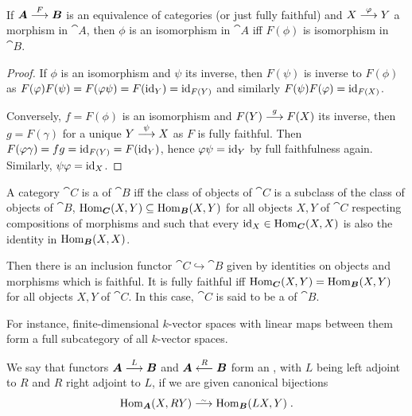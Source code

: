 \documentclass[a4paper,parskip=half,numbers=enddot, DIV=12]{scrreprt}
\begin{document}
	\begin{fact}
		If ${\cat A}\morphism[F] {\cat B}$ is an equivalence of categories (or just fully faithful) and $X\morphism[\phi]Y$ a morphism in ${\cat A}$, then $\phi$ is an isomorphism in ${\cat A}$ iff $F(\phi)$ is isomorphism in ${\cat B}$. 
	\end{fact}
	\begin{proof}
		If $\phi$ is an isomorphism and $\psi$ its inverse, then $F(\psi)$ is inverse to $F(\phi)$ as $F(\varphi)F(\psi)=F(\varphi\psi)=F(\operatorname{id}_Y)=\operatorname{id}_{F(Y)}$ and similarly $F(\psi)F(\varphi)=\operatorname{id}_{F(X)}$.
		
		Conversely, $f=F(\phi)$ is an isomorphism and $F(Y) \morphism[g] F(X)$ its inverse, then $g= F(\gamma)$ for a unique $Y\morphism[\psi] X$ as $F$ is fully faithful. Then $F(\varphi\gamma)=fg=\operatorname{id}_{F(Y)}=F(\operatorname{id}_Y)$, hence $\varphi\psi=\operatorname{id}_Y$ by full faithfulness again. Similarly, $\psi\varphi=\operatorname{id}_X$.
	\end{proof}
	\begin{defi}
		A category ${\cat C}$ is a  of ${\cat B}$ iff the class of objects of ${\cat C}$ is a subclass of the class of objects of ${\cat B}$, $\Hom_{\cat C}(X,Y) \subseteq \Hom_{\cat B}(X,Y)$ for all objects $X,Y$ of ${\cat C}$ respecting compositions of morphisms and such that every $\id_X\in\Hom_{\cat C}(X,X)$ is also the identity in $\Hom_{\cat B}(X,X)$. 
		
		Then there is an inclusion functor ${\cat C}\hookrightarrow{\cat B}$ given by identities on objects and morphisms which is faithful. It is fully faithful iff $\Hom_{\cat C}(X,Y)=\Hom_{\cat B}(X,Y)$ for all objects $X,Y$ of ${\cat C}$. In this case, ${\cat C}$ is said to be a  of ${\cat B}$. 
	\end{defi}
	\begin{example}
		For instance, finite-dimensional $k$-vector spaces with linear maps between them form a full subcategory of all $k$-vector spaces.
	\end{example}
	 \begin{defi}
	 	We say that functors ${\cat A}\morphism[L] {\cat B}$ and ${\cat A}\lmorphism[R]{\cat B}$ form an , with $L$ being left adjoint to $R$ and $R$ right adjoint to $L$, if we are given canonical bijections 
	 	\begin{align*}   
	 	\Hom_{\cat A}(X, RY) \isomorphism \Hom_{\cat B}(LX, Y)\;.
	 	\end{align*}
	 \end{defi}
\end{document}
